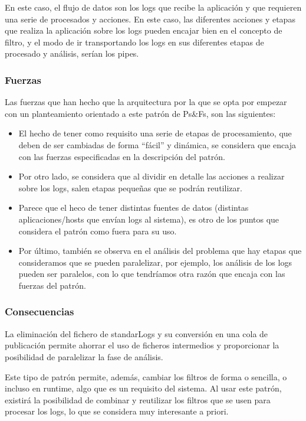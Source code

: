 \documentclass[11pt]{article}
\begin{document}
En este caso, el flujo de datos son los logs que recibe la aplicación y que requieren una serie de procesados y acciones. En este caso, las diferentes acciones y etapas que realiza la aplicación sobre los logs pueden encajar bien en el concepto de filtro, y el modo de ir transportando los logs en sus diferentes etapas de procesado y análisis, serían los pipes.

\subsubsection{Fuerzas}

Las fuerzas que han hecho que la arquitectura por la que se opta por empezar con un planteamiento orientado a este patrón de Ps\&Fs, son las siguientes:

\begin{itemize}
\item{El hecho de tener como requisito una serie de etapas de procesamiento, que deben de ser cambiadas de forma “fácil” y dinámica, se considera que encaja con las fuerzas especificadas en la descripción del patrón.}
\item{Por otro lado, se considera que al dividir en detalle las acciones a realizar sobre los logs, salen etapas pequeñas que se podrán reutilizar.}
\item{Parece que el heco de tener distintas fuentes de datos (distintas aplicaciones/hosts que envían logs al sistema), es otro de los puntos que considera el patrón como fuera para su uso.}
\item{Por último, también se observa en el análisis del problema que hay etapas que consideramos que se pueden paralelizar, por ejemplo, los análisis de los logs pueden ser paralelos, con lo que tendríamos otra razón que encaja con las fuerzas del patrón.}
\end{itemize}

\subsubsection{Consecuencias}

La eliminación del fichero de standarLogs y su conversión en una cola de publicación permite ahorrar el uso de ficheros intermedios y proporcionar la posibilidad de paralelizar la fase de análisis.

Este tipo de patrón permite, además, cambiar los filtros de forma o sencilla, o incluso en runtime, algo que es un requisito del sistema. Al usar este patrón, existirá la posibilidad de combinar y reutilizar los filtros que se usen para procesar los logs, lo que se considera muy interesante a priori.
\end{document}
